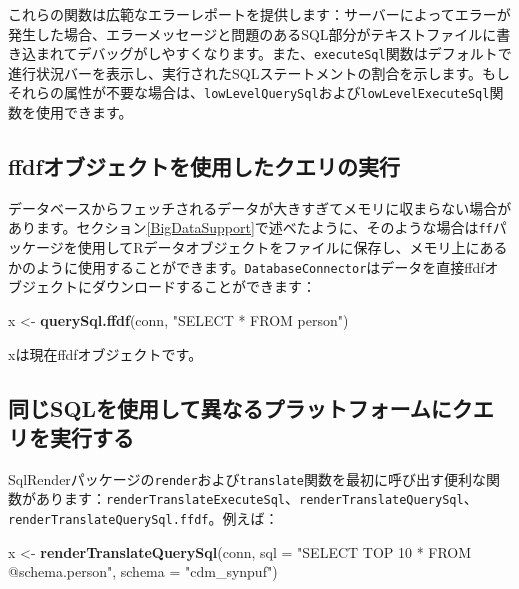 \documentclass[
  11pt]{book}
\newenvironment{Shaded}{\begin{snugshade}}{\end{snugshade}}
\newcommand{\AttributeTok}[1]{\textcolor[rgb]{0.13,0.29,0.53}{#1}}
\newcommand{\FunctionTok}[1]{\textcolor[rgb]{0.13,0.29,0.53}{\textbf{#1}}}
\newcommand{\NormalTok}[1]{#1}
\newcommand{\OtherTok}[1]{\textcolor[rgb]{0.56,0.35,0.01}{#1}}
\newcommand{\StringTok}[1]{\textcolor[rgb]{0.31,0.60,0.02}{#1}}
\theoremstyle{definition}
\theoremstyle{definition}
\theoremstyle{definition}
\theoremstyle{definition}
\theoremstyle{remark}
\begin{document}
これらの関数は広範なエラーレポートを提供します：サーバーによってエラーが発生した場合、エラーメッセージと問題のあるSQL部分がテキストファイルに書き込まれてデバッグがしやすくなります。また、\texttt{executeSql}関数はデフォルトで進行状況バーを表示し、実行されたSQLステートメントの割合を示します。もしそれらの属性が不要な場合は、\texttt{lowLevelQuerySql}および\texttt{lowLevelExecuteSql}関数を使用できます。

\subsection{ffdfオブジェクトを使用したクエリの実行}\label{ffdfux30aaux30d6ux30b8ux30a7ux30afux30c8ux3092ux4f7fux7528ux3057ux305fux30afux30a8ux30eaux306eux5b9fux884c}

データベースからフェッチされるデータが大きすぎてメモリに収まらない場合があります。セクション\ref{BigDataSupport}で述べたように、そのような場合は\texttt{ff}パッケージを使用してRデータオブジェクトをファイルに保存し、メモリ上にあるかのように使用することができます。\texttt{DatabaseConnector}はデータを直接ffdfオブジェクトにダウンロードすることができます：

\begin{Shaded}
\begin{Highlighting}[]
\NormalTok{x }\OtherTok{\textless{}{-}} \FunctionTok{querySql.ffdf}\NormalTok{(conn, }\StringTok{"SELECT * FROM person"}\NormalTok{)}
\end{Highlighting}
\end{Shaded}

xは現在ffdfオブジェクトです。

\subsection{同じSQLを使用して異なるプラットフォームにクエリを実行する}\label{ux540cux3058sqlux3092ux4f7fux7528ux3057ux3066ux7570ux306aux308bux30d7ux30e9ux30c3ux30c8ux30d5ux30a9ux30fcux30e0ux306bux30afux30a8ux30eaux3092ux5b9fux884cux3059ux308b}

SqlRenderパッケージの\texttt{render}および\texttt{translate}関数を最初に呼び出す便利な関数があります：\texttt{renderTranslateExecuteSql}、\texttt{renderTranslateQuerySql}、\texttt{renderTranslateQuerySql.ffdf}。例えば：

\begin{Shaded}
\begin{Highlighting}[]
\NormalTok{x }\OtherTok{\textless{}{-}} \FunctionTok{renderTranslateQuerySql}\NormalTok{(conn,}
                             \AttributeTok{sql =} \StringTok{"SELECT TOP 10 * FROM @schema.person"}\NormalTok{,}
                             \AttributeTok{schema =} \StringTok{"cdm\_synpuf"}\NormalTok{)}
\end{Highlighting}
\end{Shaded}
\end{document}
